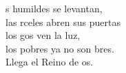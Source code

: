 \begin{cancion}%
	s humildes se levantan,\\
	las rceles abren sus puertas \\
	los gos ven la luz,\\
	los pobres ya no son bres.\\
	Llega el Reino de os.\\
\end{cancion}%
